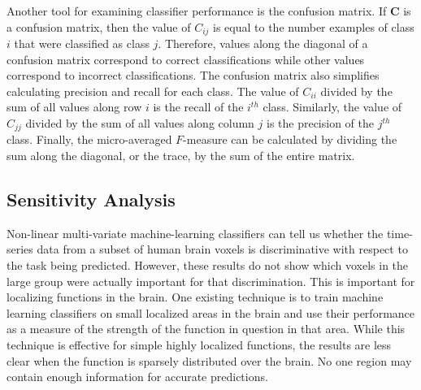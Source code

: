 \documentclass[preprint,authoryear,12pt]{elsarticle}
\begin{document}
Another tool for examining classifier performance is the confusion matrix.
If $\mathbf{C}$ is a confusion matrix, then the value of $C_{ij}$ is equal to the number examples of class $i$ that were classified as class $j$.
Therefore, values along the diagonal of a confusion matrix correspond to correct classifications while other values correspond to incorrect classifications.
The confusion matrix also simplifies calculating precision and recall for each class.
The value of $C_{ii}$ divided by the sum of all values along row $i$ is the recall of the $i^{th}$ class.
Similarly, the value of $C_{jj}$ divided by the sum of all values along column $j$ is the precision of the $j^{th}$ class.
Finally, the micro-averaged $F$-measure can be calculated by dividing the sum along the diagonal, or the trace, by the sum of the entire matrix.

\subsection{Sensitivity Analysis}
Non-linear multi-variate machine-learning classifiers can tell us whether the time-series data from a subset of human brain voxels is discriminative with respect to the task being predicted. 
However, these results do not show which voxels in the large group were actually important for that discrimination.
This is important for localizing functions in the brain.
One existing technique is to train machine learning classifiers on small localized areas in the brain and use their performance as a measure of the strength of the function in question in that area.
While this technique is effective for simple highly localized functions, the results are less clear when the function is sparsely distributed over the brain.
No one region may contain enough information for accurate predictions.
\end{document}
